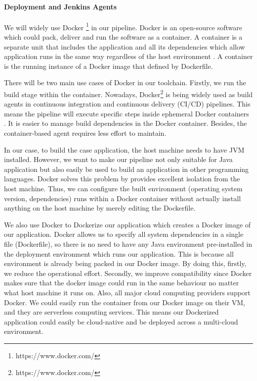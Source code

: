 \paragraph[]{Deployment and Jenkins Agents}
We will widely use Docker \footnote{https://www.docker.com/} in our pipeline.
Docker is an open-source software which could pack, deliver and run the software as a container. A container is a separate unit that includes the application and all its dependencies which allow application runs in the same way regardless of the host environment \cite{WhatisaC60:online}. A container is the running instance of a Docker image that defined by Dockerfile.
\par
\label{docker}
There will be two main use cases of Docker in our toolchain. Firstly, we run the build stage within the container.
Nowadays, Docker\footnote{https://www.docker.com/} is being widely used as build agents in continuous integration and continuous delivery (CI/CD) pipelines.
This means the pipeline will execute specific steps inside ephemeral Docker containers \cite{Overview44:online}. It is easier to manage build dependencies in the Docker container. Besides, the container-based agent requires less effort to maintain.
\par
In our case, to build the case application, the host machine needs to have JVM installed. However, we want to make our pipeline not only suitable for Java application but also easily be used to build an application in other programming languages. Docker solves this problem by provides excellent isolation from the host machine. Thus, we can configure the built environment (operating system version, dependencies) runs within a Docker container without actually install anything on the host machine by merely editing the Dockerfile.
\par
We also use Docker to Dockerize our application which creates a Docker image of our application.
Docker allows us to specify all system dependencies in a single file (Dockerfile), so there is no need to have any Java environment pre-installed in the deployment environment which runs our application. This is because all environment is already being packed in our Docker image. By doing this, firstly, we reduce the operational effort. Secondly, we improve compatibility since Docker makes sure that the docker image could run in the same behaviour no matter what host machine it runs on. Also, all major cloud computing providers support Docker. We could easily run the container from our Docker image on their VM, and they are serverless computing services. This means our Dockerized application could easily be cloud-native and be deployed across a multi-cloud environment.
